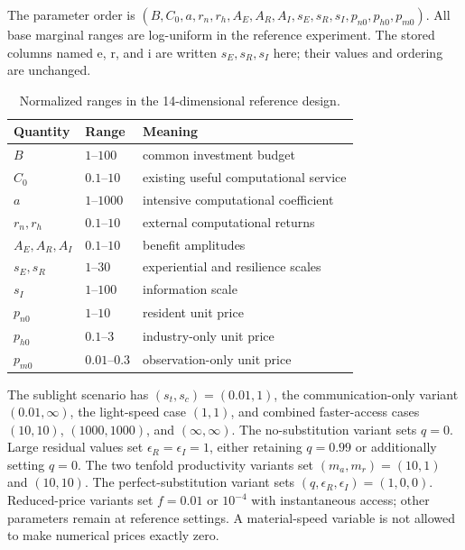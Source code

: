 \documentclass[11pt,a4paper]{article}
\theoremstyle{definition}\newtheorem{definition}{Definition}
\begin{document}
The parameter order is $(B,C_0,a,r_n,r_h,A_E,A_R,A_I,s_E,s_R,s_I,p_{n0},p_{h0},p_{m0})$. All base marginal ranges are log-uniform in the reference experiment. The stored columns named e, r, and i are written $s_E,s_R,s_I$ here; their values and ordering are unchanged.

\begin{table}[htbp]
\centering
\caption{Normalized ranges in the 14-dimensional reference design.}
\label{tab:ranges}
\begin{tabular}{@{}lll@{}}
\toprule
Quantity & Range & Meaning\\
\midrule
$B$ & $1$--$100$ & common investment budget\\
$C_0$ & $0.1$--$10$ & existing useful computational service\\
$a$ & $1$--$1000$ & intensive computational coefficient\\
$r_n,r_h$ & $0.1$--$10$ & external computational returns\\
$A_E,A_R,A_I$ & $0.1$--$10$ & benefit amplitudes\\
$s_E,s_R$ & $1$--$30$ & experiential and resilience scales\\
$s_I$ & $1$--$100$ & information scale\\
$p_{n0}$ & $1$--$10$ & resident unit price\\
$p_{h0}$ & $0.1$--$3$ & industry-only unit price\\
$p_{m0}$ & $0.01$--$0.3$ & observation-only unit price\\
\bottomrule
\end{tabular}
\end{table}

The sublight scenario has $(s_t,s_c)=(0.01,1)$, the communication-only variant $(0.01,\infty)$, the light-speed case $(1,1)$, and combined faster-access cases $(10,10)$, $(1000,1000)$, and $(\infty,\infty)$. The no-substitution variant sets $q=0$. Large residual values set $\epsilon_R=\epsilon_I=1$, either retaining $q=0.99$ or additionally setting $q=0$. The two tenfold productivity variants set $(m_a,m_r)=(10,1)$ and $(10,10)$. The perfect-substitution variant sets $(q,\epsilon_R,\epsilon_I)=(1,0,0)$. Reduced-price variants set $f=0.01$ or $10^{-4}$ with instantaneous access; other parameters remain at reference settings. A material-speed variable is not allowed to make numerical prices exactly zero.
\end{document}
